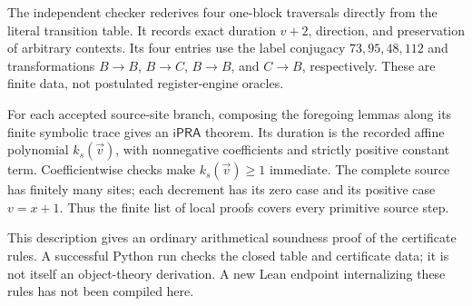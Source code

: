 \documentclass[11pt]{article}
\newcommand{\ipra}{\mathsf{iPRA}}
\begin{document}
The independent checker rederives four one-block traversals directly from
the literal transition table. It records exact duration $v+2$, direction,
and preservation of arbitrary contexts. Its four entries use the label
conjugacy $73,95,48,112$ and transformations $B\to B$, $B\to C$,
$B\to B$, and $C\to B$, respectively. These are finite data, not
postulated register-engine oracles.

For each accepted source-site branch, composing the foregoing lemmas
along its finite symbolic trace gives an $\ipra$ theorem. Its duration is
the recorded affine polynomial $k_s(\vec v)$, with nonnegative coefficients
and strictly positive constant term. Coefficientwise checks make
$k_s(\vec v)\ge1$ immediate. The complete source has finitely many sites;
each decrement has its zero case and its positive case $v=x+1$. Thus the
finite list of local proofs covers every primitive source step.

This description gives an ordinary arithmetical soundness proof of the
certificate rules. A successful Python run checks the closed table and
certificate data; it is not itself an object-theory derivation. A new Lean
endpoint internalizing these rules has not been compiled here.
\end{document}
